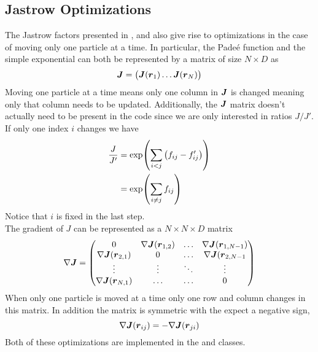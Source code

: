 \subsection{Jastrow Optimizations}
    The Jastrow factors presented in ,
     and  also give rise to
    optimizations in the case of moving only one particle at a time. In
    particular, the Pade\'e function and the simple exponential can both be
    represented by a matrix of size $N\times D$ as
        \begin{equation}
            \blds{J} = 
                \begin{pmatrix}
                    \blds{J}(\blds{r}_1) \dots \blds{J}(\blds{r}_N)
                \end{pmatrix}
        \end{equation}
    Moving one particle at a time means only one column in $\boldsymbol{{J}}$ is
    changed meaning only that column needs to be updated. Additionally, the
    $\boldsymbol{{J}}$ matrix doesn't actually need to be present in the code since we
    are only interested in ratios $J/J'$. If only one index $i$ changes we have
        \begin{align}
            \frac{J}{J'} &= \exp(\sum\limits_{i<j} \left(f_{ij} - f'_{ij}\right))
            \nonumber \\
            &= \exp(\sum\limits_{i\neq j} f_{ij})
        \end{align}
    Notice that $i$ is fixed in the last step. \\
    The gradient of $J$ can be represented as a $N\times N\times D$ matrix
        \begin{equation}
            \nabla \boldsymbol{{J}} = 
                \begin{pmatrix}
                    0 & \nabla \boldsymbol{{J}}(\boldsymbol{{r}}_{1,2}) & \dots & \nabla
                    \boldsymbol{{J}}(\boldsymbol{{r}}_{1,N-1}) \\
                    \nabla \boldsymbol{{J}}(\boldsymbol{{r}}_{2,1}) & 0 & \dots & \nabla
                    \boldsymbol{{J}}(\boldsymbol{{r}}_{2,N-1} \\
                    \vdots & \vdots & \ddots & \vdots \\
                    \nabla \boldsymbol{{J}}(\boldsymbol{{r}}_{N,1}) & \dots & \dots & 0 
                \end{pmatrix}
        \end{equation}
    When only one particle is moved at a time only one row and column changes
    in this matrix. In addition the matrix is symmetric with the expect a
    negative sign,
        \begin{equation}
            \nabla \boldsymbol{{J}}(\boldsymbol{{r}}_{ij}) = -\nabla\boldsymbol{{J}}(\boldsymbol{{r}}_{ji})
        \end{equation}
    Both of these optimizations are implemented in the 
    and  classes. \\ 


